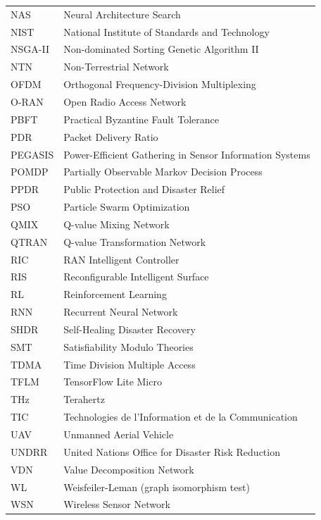 \begin{longtable}{lp{5in}}
NAS        & Neural Architecture Search\\
NIST       & National Institute of Standards and Technology\\
NSGA-II    & Non-dominated Sorting Genetic Algorithm II\\
NTN        & Non-Terrestrial Network\\
OFDM       & Orthogonal Frequency-Division Multiplexing\\
O-RAN      & Open Radio Access Network\\
PBFT       & Practical Byzantine Fault Tolerance\\
PDR        & Packet Delivery Ratio\\
PEGASIS    & Power-Efficient Gathering in Sensor Information Systems\\
POMDP      & Partially Observable Markov Decision Process\\
PPDR       & Public Protection and Disaster Relief\\
PSO        & Particle Swarm Optimization\\
QMIX       & Q-value Mixing Network\\
QTRAN      & Q-value Transformation Network\\
RIC        & RAN Intelligent Controller\\
RIS        & Reconfigurable Intelligent Surface\\
RL         & Reinforcement Learning\\
RNN        & Recurrent Neural Network\\
SHDR       & Self-Healing Disaster Recovery\\
SMT        & Satisfiability Modulo Theories\\
TDMA       & Time Division Multiple Access\\
TFLM       & TensorFlow Lite Micro\\
THz        & Terahertz\\
TIC        & Technologies de l'Information et de la Communication\\
UAV        & Unmanned Aerial Vehicle\\
UNDRR      & United Nations Office for Disaster Risk Reduction\\
VDN        & Value Decomposition Network\\
WL         & Weisfeiler-Leman (graph isomorphism test)\\
WSN        & Wireless Sensor Network\\
\end{longtable}

